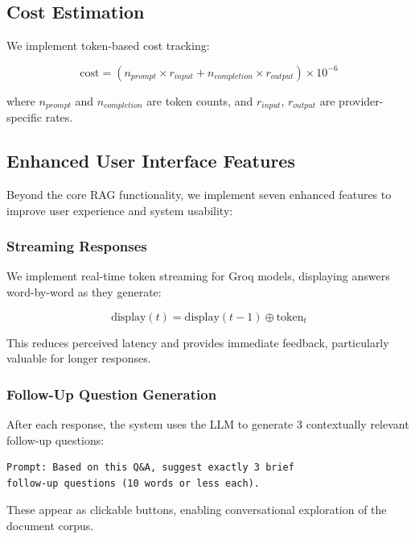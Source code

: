 \documentclass[runningheads]{llncs}
\begin{document}
\subsection{Cost Estimation}

We implement token-based cost tracking:

\begin{equation}
\text{cost} = (n_{prompt} \times r_{input} + n_{completion} \times r_{output}) \times 10^{-6}
\end{equation}

where $n_{prompt}$ and $n_{completion}$ are token counts, and $r_{input}$, $r_{output}$ are provider-specific rates.

\subsection{Enhanced User Interface Features}

Beyond the core RAG functionality, we implement seven enhanced features to improve user experience and system usability:

\subsubsection{Streaming Responses}

We implement real-time token streaming for Groq models, displaying answers word-by-word as they generate:

\begin{equation}
\text{display}(t) = \text{display}(t-1) \oplus \text{token}_t
\end{equation}

This reduces perceived latency and provides immediate feedback, particularly valuable for longer responses.

\subsubsection{Follow-Up Question Generation}

After each response, the system uses the LLM to generate 3 contextually relevant follow-up questions:

\begin{verbatim}
Prompt: Based on this Q&A, suggest exactly 3 brief 
follow-up questions (10 words or less each).
\end{verbatim}

These appear as clickable buttons, enabling conversational exploration of the document corpus.
\end{document}
